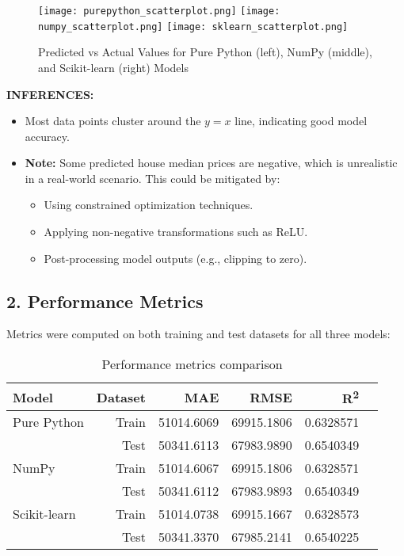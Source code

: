 \documentclass[a4paper,12pt]{article}
\begin{document}
\begin{figure}[H]
    \centering
    \texttt{[image: purepython\_scatterplot.png]}
    \texttt{[image: numpy\_scatterplot.png]}
    \texttt{[image: sklearn\_scatterplot.png]}
    \caption{Predicted vs Actual Values for Pure Python (left), NumPy (middle), and Scikit-learn (right) Models}
\end{figure}

\textbf{INFERENCES:}
\begin{itemize}
    \item Most data points cluster around the \(y = x\) line, indicating good model accuracy.
    \item \textbf{Note:} Some predicted house median prices are negative, which is unrealistic in a real-world scenario. This could be mitigated by:
    \begin{itemize}
        \item Using constrained optimization techniques.
        \item Applying non-negative transformations such as ReLU.
        \item Post-processing model outputs (e.g., clipping to zero).
    \end{itemize}
\end{itemize}

\subsection{2. Performance Metrics}

Metrics were computed on both training and test datasets for all three models:

\begin{table}[H]
    \centering
    \begin{tabular}{lrrrrr}
    \toprule
    Model & Dataset & MAE & RMSE & R\textsuperscript{2} \\
    \midrule
    Pure Python & Train & 51014.6069 & 69915.1806 & 0.6328571 \\
                & Test  & 50341.6113 & 67983.9890 & 0.6540349 \\
    NumPy       & Train & 51014.6067 & 69915.1806 & 0.6328571 \\
                & Test  & 50341.6112 & 67983.9893 & 0.6540349 \\
    Scikit-learn& Train & 51014.0738 & 69915.1667 & 0.6328573 \\
                & Test  & 50341.3370 & 67985.2141 & 0.6540225 \\
    \bottomrule
    \end{tabular}
    \caption{Performance metrics comparison}
\end{table}
\end{document}
